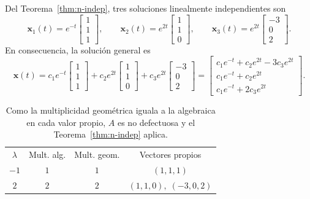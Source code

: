 \begin{example}
\medskip
\noindent Del Teorema~\ref{thm:n-indep}, tres soluciones linealmente independientes son
\[
\mathbf{x}_1(t) = e^{-t} \begin{bmatrix} 1 \\ 1 \\ 1 \end{bmatrix}, \qquad \mathbf{x}_2(t) = e^{2t} \begin{bmatrix} 1 \\ 1 \\ 0 \end{bmatrix}, \qquad \mathbf{x}_3(t) = e^{2t} \begin{bmatrix} -3 \\ 0 \\ 2 \end{bmatrix}.
\]
En consecuencia, la soluci\'on general es
\[
\mathbf{x}(t) = c_1 e^{-t} \begin{bmatrix} 1 \\ 1 \\ 1 \end{bmatrix} + c_2 e^{2t} \begin{bmatrix} 1 \\ 1 \\ 0 \end{bmatrix} + c_3 e^{2t} \begin{bmatrix} -3 \\ 0 \\ 2 \end{bmatrix}
= \begin{bmatrix} c_1 e^{-t} + c_2 e^{2t} - 3c_3 e^{2t} \\ c_1 e^{-t} + c_2 e^{2t} \\ c_1 e^{-t} + 2c_3 e^{2t} \end{bmatrix}.
\]
\end{example}

\begin{table}[H]
\centering
\renewcommand{\arraystretch}{1.4}
\begin{tabular}{c c c c}
\rowcolor{bbe!15}
\textcolor{bbe}{$\lambda$} & \textcolor{bbe}{Mult. alg.} & \textcolor{bbe}{Mult. geom.} & \textcolor{bbe}{Vectores propios}\\
$-1$ & $1$ & $1$ & $(1,1,1)$ \\
$2$ & $2$ & $2$ & $(1,1,0),\;(-3,0,2)$ \\
\end{tabular}
\caption{Como la multiplicidad geom\'etrica iguala a la algebraica en cada valor propio, $A$ es no defectuosa y el Teorema~\ref{thm:n-indep} aplica.}
\end{table}

